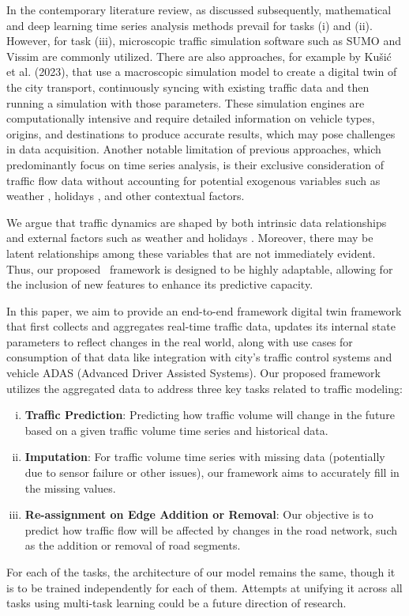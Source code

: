In the contemporary literature review, as discussed subsequently, mathematical and deep learning time series analysis methods prevail for tasks (i) and (ii). However, for task (iii), microscopic traffic simulation software such as SUMO \cite{sumo} and Vissim \cite{vissim} are commonly utilized. There are also approaches, for example by Kušić et al. (2023)\cite{kusic2023digital}, that use a macroscopic simulation model to create a digital twin of the city transport, continuously syncing with existing traffic data and then running a simulation with those parameters. These simulation engines are computationally intensive and require detailed information on vehicle types, origins, and destinations to produce accurate results, which may pose challenges in data acquisition. Another notable limitation of previous approaches, which predominantly focus on time series analysis, is their exclusive consideration of traffic flow data without accounting for potential exogenous variables such as weather \cite{weather}, holidays \cite{holiday}, and other contextual factors.

We argue that traffic dynamics are shaped by both intrinsic data relationships and external factors such as weather \cite{weather} and holidays \cite{holiday}. Moreover, there may be latent relationships among these variables that are not immediately evident. Thus, our proposed \name\ framework is designed to be highly adaptable, allowing for the inclusion of new features to enhance its predictive capacity.

In this paper, we aim to provide an end-to-end framework digital twin framework that first collects and aggregates real-time traffic data, updates its internal state parameters to reflect changes in the real world, along with use cases for consumption of that data like integration with city's traffic control systems and vehicle ADAS (Advanced Driver Assisted Systems). Our proposed framework utilizes the aggregated data to address three key tasks related to traffic modeling:
\begin{enumerate}[(i)]
\item \textbf{Traffic Prediction}: Predicting how traffic volume will change in the future based on a given traffic volume time series and historical data.
\item \textbf{Imputation}: For traffic volume time series with missing data (potentially due to sensor failure or other issues), our framework aims to accurately fill in the missing values.
\item \textbf{Re-assignment on Edge Addition or Removal}: Our objective is to predict how traffic flow will be affected by changes in the road network, such as the addition or removal of road segments.
\end{enumerate}
For each of the tasks, the architecture of our model remains the same, though it is to be trained independently for each of them. Attempts at unifying it across all tasks using multi-task learning could be a future direction of research.

